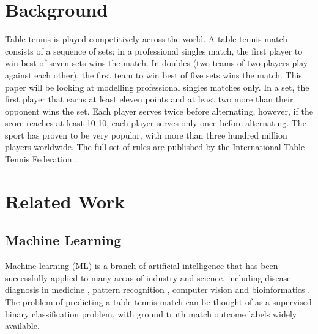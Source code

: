 \section{Background}
Table tennis is played competitively across the world. A table tennis match consists of a sequence of sets; in a professional singles match, the first player to win best of seven sets wins the match. In doubles (two teams of two players play against each other), the first team to win best of five sets wins the match. This paper will be looking at modelling professional singles matches only.
In a set, the first player that earns at least eleven points and at least two more than their opponent wins the set. Each player serves twice before alternating, however, if the score reaches at least 10-10, each player serves only once before alternating.
The sport has proven to be very popular, with more than three hundred million players worldwide. %
The full set of rules are published by the International Table Tennis Federation \cite{ITTF}.

\section{Related Work} \label{sec:relatedwork}
\subsection{Machine Learning}
Machine learning (ML) is a branch of artificial intelligence that has been successfully applied to many areas of industry and science, including disease diagnosis in medicine \cite{kourou2015machine}, pattern recognition \cite{weiss1989empirical}, computer vision \cite{khan2020machine} and bioinformatics \cite{larranaga2006machine}.
The problem of predicting a table tennis match can be thought of as a supervised binary classification problem, with ground truth match outcome labels widely available. %


